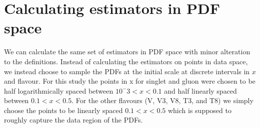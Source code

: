 \section{Calculating estimators in PDF space}

We can calculate the same set of estimators in PDF space with minor alteration
to the definitions. Instead of calculating the estimators on points in data space,
we instead choose to sample the PDFs at the initial scale at discrete intervals
in $x$ and flavour. For this study the
points in x for singlet and gluon were chosen to be half logarithmically spaced
between $10^-3<x<0.1$ and half linearly spaced between $0.1<x<0.5$. For the
other flavours (V, V3, V8, T3, and T8) we simply choose the points to be
linearly spaced $0.1<x<0.5$ which is supposed to roughly capture the data region
of the PDFs.

